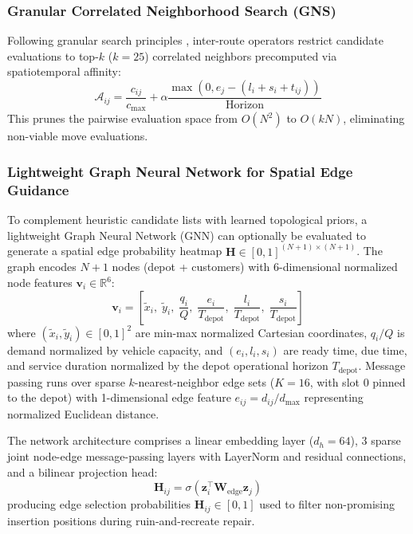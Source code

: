\subsubsection{Granular Correlated Neighborhood Search (GNS)}
Following granular search principles \cite{toth2003granular}, inter-route operators restrict candidate evaluations to top-$k$ ($k=25$) correlated neighbors precomputed via spatiotemporal affinity:
\begin{equation}
  \mathcal{A}_{ij} = \frac{c_{ij}}{c_{\max}} + \alpha \frac{\max(0, e_j - (l_i + s_i + t_{ij}))}{\text{Horizon}}
  \label{eq:granular_affinity}
\end{equation}
This prunes the pairwise evaluation space from $O(N^2)$ to $O(k N)$, eliminating non-viable move evaluations.

\subsubsection{Lightweight Graph Neural Network for Spatial Edge Guidance}
\label{sec:gnn_guidance}
To complement heuristic candidate lists with learned topological priors, a lightweight Graph Neural Network (GNN) can optionally be evaluated to generate a spatial edge probability heatmap $\mathbf{H} \in [0, 1]^{(N+1)\times (N+1)}$. The graph encodes $N+1$ nodes (depot + customers) with 6-dimensional normalized node features $\mathbf{v}_i \in \mathbb{R}^6$:
\begin{equation}
  \mathbf{v}_i = \left[ \tilde{x}_i, \; \tilde{y}_i, \; \frac{q_i}{Q}, \; \frac{e_i}{T_{\text{depot}}}, \; \frac{l_i}{T_{\text{depot}}}, \; \frac{s_i}{T_{\text{depot}}} \right]
  \label{eq:gnn_node_feats}
\end{equation}
where $(\tilde{x}_i, \tilde{y}_i) \in [0, 1]^2$ are min-max normalized Cartesian coordinates, $q_i / Q$ is demand normalized by vehicle capacity, and $(e_i, l_i, s_i)$ are ready time, due time, and service duration normalized by the depot operational horizon $T_{\text{depot}}$. Message passing runs over sparse $k$-nearest-neighbor edge sets ($K=16$, with slot 0 pinned to the depot) with 1-dimensional edge feature $e_{ij} = d_{ij} / d_{\max}$ representing normalized Euclidean distance.

The network architecture comprises a linear embedding layer ($d_h = 64$), 3 sparse joint node-edge message-passing layers with LayerNorm and residual connections, and a bilinear projection head:
\begin{equation}
  \mathbf{H}_{ij} = \sigma\left( \mathbf{z}_i^{\top} \mathbf{W}_{\text{edge}} \mathbf{z}_j \right)
  \label{eq:gnn_bilinear_head}
\end{equation}
producing edge selection probabilities $\mathbf{H}_{ij} \in [0, 1]$ used to filter non-promising insertion positions during ruin-and-recreate repair.

